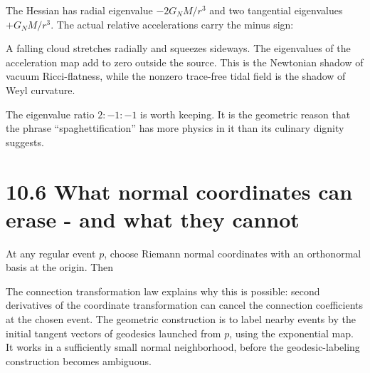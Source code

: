 \documentclass[
  11pt,
  letterpaper,
  oneside,
  openany]{scrbook}
\begin{document}
The Hessian has radial eigenvalue \(-2G_NM/r^3\) and two tangential
eigenvalues \(+G_NM/r^3\). The actual relative accelerations carry the
minus sign:

\begin{center}
\begingroup
{}
\ifdim\wd\grmathbox>\linewidth
\resizebox{\linewidth}{!}{\usebox{\grmathbox}}
\else\usebox{\grmathbox}\fi
\endgroup
\end{center}

A falling cloud stretches radially and squeezes sideways. The
eigenvalues of the acceleration map add to zero outside the source. This
is the Newtonian shadow of vacuum Ricci-flatness, while the nonzero
trace-free tidal field is the shadow of Weyl curvature.

The eigenvalue ratio \(2:-1:-1\) is worth keeping. It is the geometric
reason that the phrase ``spaghettification'' has more physics in it than
its culinary dignity suggests.

\hypertarget{what-normal-coordinates-can-erase---and-what-they-cannot}{%
\section{10.6 What normal coordinates can erase - and what they
cannot}\label{what-normal-coordinates-can-erase---and-what-they-cannot}}

At any regular event \(p\), choose Riemann normal coordinates with an
orthonormal basis at the origin. Then

\begin{center}
\begingroup
{}
\ifdim\wd\grmathbox>\linewidth
\resizebox{\linewidth}{!}{\usebox{\grmathbox}}
\else\usebox{\grmathbox}\fi
\endgroup
\end{center}

The connection transformation law explains why this is possible: second
derivatives of the coordinate transformation can cancel the connection
coefficients at the chosen event. The geometric construction is to label
nearby events by the initial tangent vectors of geodesics launched from
\(p\), using the exponential map. It works in a sufficiently small
normal neighborhood, before the geodesic-labeling construction becomes
ambiguous.
\end{document}
